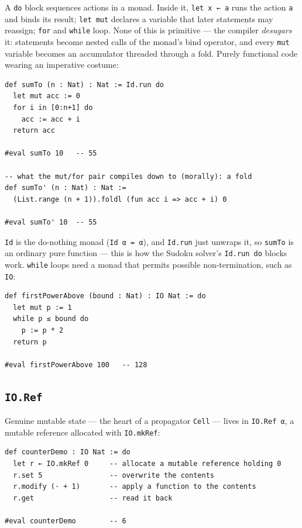 \documentclass[12pt, a4paper, openright]{book}
\theoremstyle{thmstyle}
\theoremstyle{defstyle}
\newcommand{\lc}[1]{\texttt{#1}}
\begin{document}
A \lc{do} block sequences actions in a monad. Inside it, \lc{let x ← a}
runs the action \lc{a} and binds its result; \lc{let mut} declares a
variable that later statements may reassign; \lc{for} and \lc{while} loop.
None of this is primitive --- the compiler \emph{desugars} it: statements
become nested calls of the monad's bind operator, and every \lc{mut}
variable becomes an accumulator threaded through a fold. Purely
functional code wearing an imperative costume:

\begin{verbatim}
def sumTo (n : Nat) : Nat := Id.run do
  let mut acc := 0
  for i in [0:n+1] do
    acc := acc + i
  return acc

#eval sumTo 10   -- 55

-- what the mut/for pair compiles down to (morally): a fold
def sumTo' (n : Nat) : Nat :=
  (List.range (n + 1)).foldl (fun acc i => acc + i) 0

#eval sumTo' 10  -- 55
\end{verbatim}

\lc{Id} is the do-nothing monad (\lc{Id α = α}), and \lc{Id.run} just
unwraps it, so \lc{sumTo} is an ordinary pure function --- this is how the
Sudoku solver's \lc{Id.run do} blocks work. \lc{while} loops need a monad
that permits possible non-termination, such as \lc{IO}:

\begin{verbatim}
def firstPowerAbove (bound : Nat) : IO Nat := do
  let mut p := 1
  while p ≤ bound do
    p := p * 2
  return p

#eval firstPowerAbove 100   -- 128
\end{verbatim}

\subsection*{\lc{IO.Ref}}

Genuine mutable state --- the heart of a propagator \lc{Cell} --- lives in
\lc{IO.Ref α}, a mutable reference allocated with \lc{IO.mkRef}:

\begin{verbatim}
def counterDemo : IO Nat := do
  let r ← IO.mkRef 0     -- allocate a mutable reference holding 0
  r.set 5                -- overwrite the contents
  r.modify (· + 1)       -- apply a function to the contents
  r.get                  -- read it back

#eval counterDemo        -- 6
\end{verbatim}
\end{document}
